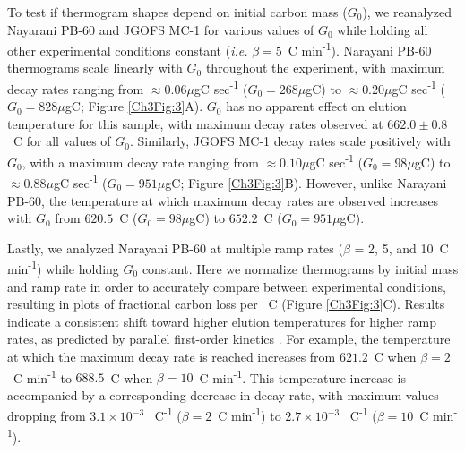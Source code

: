 To test if thermogram shapes depend on initial carbon mass ($G_0$), we reanalyzed Nayarani PB-60 and JGOFS MC-1 for various values of $G_0$ while holding all other experimental conditions constant (\textit{i.e.} $\beta = 5$\textdegree\ C min\textsuperscript{-1}). Narayani PB-60 thermograms scale linearly with $G_0$ throughout the experiment, with maximum decay rates ranging from $\approx 0.06 \mu$gC sec\textsuperscript{-1} ($G_0 = 268 \mu$gC) to $\approx 0.20 \mu$gC sec\textsuperscript{-1} ($G_0 = 828 \mu$gC; Figure \ref{Ch3Fig:3}A). $G_0$ has no apparent effect on elution temperature for this sample, with maximum decay rates observed at $662.0 \pm 0.8$\textdegree\ C for all values of $G_0$. Similarly, JGOFS MC-1 decay rates scale positively with $G_0$, with a maximum decay rate ranging from $\approx 0.10 \mu$gC sec\textsuperscript{-1} ($G_0 = 98 \mu$gC) to $\approx 0.88 \mu$gC sec\textsuperscript{-1} ($G_0 = 951 \mu$gC; Figure \ref{Ch3Fig:3}B). However, unlike Narayani PB-60, the temperature at which maximum decay rates are observed increases with $G_0$ from $620.5$\textdegree\ C ($G_0 = 98 \mu$gC) to $652.2$\textdegree\ C ($G_0 = 951 \mu$gC).

Lastly, we analyzed Narayani PB-60 at multiple ramp rates ($\beta$ = 2, 5, and 10\textdegree\ C min\textsuperscript{-1}) while holding $G_0$ constant. Here we normalize thermograms by initial mass and ramp rate in order to accurately compare between experimental conditions, resulting in plots of fractional carbon loss per \textdegree\ C (Figure \ref{Ch3Fig:3}C). Results indicate a consistent shift toward higher elution temperatures for higher ramp rates, as predicted by parallel first-order kinetics \citep{Braun:1987vf,Miura:1995uo,Miura:1998jf}. For example, the temperature at which the maximum decay rate is reached increases from $621.2$\textdegree\ C when $\beta = 2$\textdegree\ C min\textsuperscript{-1} to $688.5$\textdegree\ C when $\beta = 10$\textdegree\ C min\textsuperscript{-1}. This temperature increase is accompanied by a corresponding decrease in decay rate, with maximum values dropping from $3.1 \times 10^{-3}$ \textdegree\ C\textsuperscript{-1} ($\beta = 2$\textdegree\ C min\textsuperscript{-1}) to $2.7 \times 10^{-3}$ \textdegree\ C\textsuperscript{-1} ($\beta = 10$\textdegree\ C min\textsuperscript{-1}).

